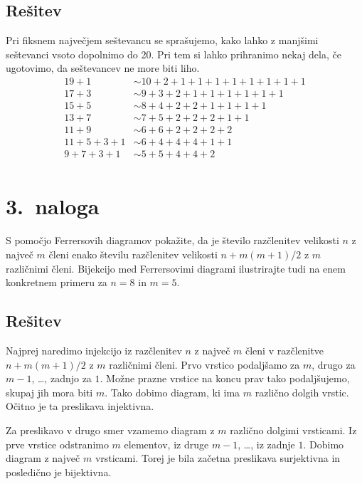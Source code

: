 \documentclass[11pt]{article}
\begin{document}
\subsection*{Rešitev}
Pri fiksnem največjem seštevancu se sprašujemo, kako lahko z manjšimi seštevanci vsoto dopolnimo do 20. Pri tem 
si lahko prihranimo nekaj dela, če ugotovimo, da seštevancev ne more biti liho.
\begin{align*}
    19 + 1 & \sim 10 + 2 + 1 + 1 + 1 + 1 + 1 + 1 + 1 + 1 \\
    17 + 3 & \sim 9 + 3 + 2 + 1 + 1 + 1 + 1 + 1 + 1 \\
    15 + 5 & \sim 8 + 4 + 2 + 2 + 1 + 1 + 1 + 1 \\
    13 + 7 & \sim 7 + 5 + 2 + 2 + 2 + 1 + 1 \\
    11 + 9 & \sim 6 + 6 + 2 + 2 + 2 + 2 \\
    11 + 5 + 3 + 1 & \sim 6 + 4 + 4 + 4 + 1 + 1 \\
    9 + 7 + 3 + 1 & \sim 5 + 5 + 4 + 4 + 2 \\
\end{align*}

\section*{3.~naloga}
S pomočjo Ferrersovih diagramov pokažite, da je število razčlenitev velikosti \(n\) z največ
\(m\) členi enako številu razčlenitev velikosti \(n + m(m + 1)/2\) z \(m\) različnimi členi. Bijekcijo
med Ferrersovimi diagrami ilustrirajte tudi na enem konkretnem primeru za \(n = 8\) in
\(m = 5\).

\subsection*{Rešitev}
Najprej naredimo injekcijo iz razčlenitev \(n\) z največ \(m\) členi v razčlenitve \(n + m(m + 1)/2\) z \(m\) različnimi členi.
Prvo vrstico podaljšamo za \(m\), drugo za \(m - 1\), \ldots, zadnjo za \(1\). Možne prazne vrstice na koncu prav tako podaljšujemo, skupaj jih mora biti \(m\).
Tako dobimo diagram, ki ima \(m\) različno dolgih vrstic. Očitno je ta preslikava injektivna.

Za preslikavo v drugo smer vzamemo diagram z \(m\) različno dolgimi vrsticami. Iz prve vrstice odstranimo \(m\) elementov, iz druge \(m - 1\), \ldots, iz zadnje \(1\).
Dobimo diagram z največ \(m\) vrsticami. Torej je bila začetna preslikava surjektivna in posledično je bijektivna.
\end{document}
